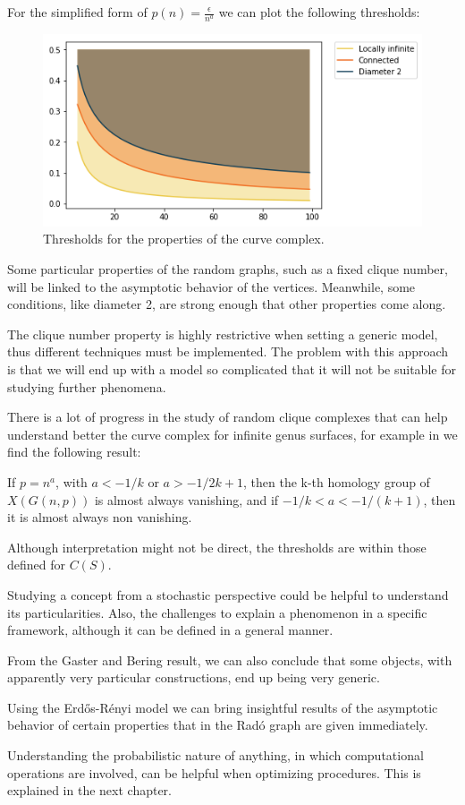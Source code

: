 For the simplified form of $p(n) = \frac{\epsilon}{n^{a}}$ we can plot the following thresholds:

\begin{figure}[h!]
	\centering
	\includegraphics[scale=0.7]{Python/Figures/ER-thresholds.png}
	\caption{Thresholds for the properties of the curve complex.}
\end{figure}

Some particular properties of the random graphs, such as a fixed clique number, will be linked to the asymptotic behavior of the vertices. Meanwhile, some conditions, like diameter 2, are strong enough that other properties come along.

The clique number property is highly restrictive when setting a generic model, thus different techniques must be implemented. The problem with this approach is that we will end up with a model so complicated that it will not be suitable for studying further phenomena.

There is a lot of progress in the study of random clique complexes that can help understand better the curve complex for infinite genus surfaces, for example in \cite[Khale,09]{kahle2009topology} we find the following result:
\begin{theorem}
If $p=n^{a}$, with $a < -1/k$ or
$a > -1/2k+1$, then the k-th homology group of $X(G(n, p))$ is almost always vanishing, and if $-1/k < a < -1/(k + 1)$, then it is almost always non vanishing.
\end{theorem}
Although interpretation might not be direct, the thresholds are within those defined for $C(S)$.

Studying a concept from a stochastic perspective could be helpful to understand its particularities. Also, the challenges to explain a phenomenon in a specific framework, although it can be defined in a general manner.

From the Gaster and Bering result, we can also conclude that some objects, with apparently very particular constructions, end up being very generic.

Using the Erdős-Rényi model we can bring insightful results of the asymptotic behavior of certain properties that in the Radó graph are given immediately.

Understanding the probabilistic nature of anything, in which computational operations are involved, can be helpful when optimizing procedures. This is explained in the next chapter.